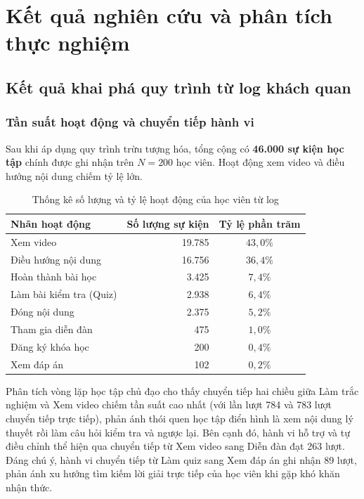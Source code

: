 \section{Kết quả nghiên cứu và phân tích thực nghiệm}

\subsection{Kết quả khai phá quy trình từ log khách quan}

\subsubsection{Tần suất hoạt động và chuyển tiếp hành vi}
Sau khi áp dụng quy trình trừu tượng hóa, tổng cộng có \textbf{46.000 sự kiện học tập} chính được ghi nhận trên $N = 200$ học viên. Hoạt động xem video và điều hướng nội dung chiếm tỷ lệ lớn.

\begin{table}[H]
\centering
\caption{Thống kê số lượng và tỷ lệ hoạt động của học viên từ log}
\label{tab:thong_ke_hoat_dong}
\begin{tabular}{lrc}
\toprule
\textbf{Nhãn hoạt động} & \textbf{Số lượng sự kiện} & \textbf{Tỷ lệ phần trăm} \\
\midrule
Xem video & 19.785 & $43,0\%$ \\
Điều hướng nội dung & 16.756 & $36,4\%$ \\
Hoàn thành bài học & 3.425 & $7,4\%$ \\
Làm bài kiểm tra (Quiz) & 2.938 & $6,4\%$ \\
Đóng nội dung & 2.375 & $5,2\%$ \\
Tham gia diễn đàn & 475 & $1,0\%$ \\
Đăng ký khóa học & 200 & $0,4\%$ \\
Xem đáp án & 102 & $0,2\%$ \\
\bottomrule
\end{tabular}
\end{table}

Phân tích vòng lặp học tập chủ đạo cho thấy chuyển tiếp hai chiều giữa Làm trắc nghiệm và Xem video chiếm tần suất cao nhất (với lần lượt 784 và 783 lượt chuyển tiếp trực tiếp), phản ánh thói quen học tập điển hình là xem nội dung lý thuyết rồi làm câu hỏi kiểm tra và ngược lại. Bên cạnh đó, hành vi hỗ trợ và tự điều chỉnh thể hiện qua chuyển tiếp từ Xem video sang Diễn đàn đạt 263 lượt. Đáng chú ý, hành vi chuyển tiếp từ Làm quiz sang Xem đáp án ghi nhận 89 lượt, phản ánh xu hướng tìm kiếm lời giải trực tiếp của học viên khi gặp khó khăn nhận thức.

